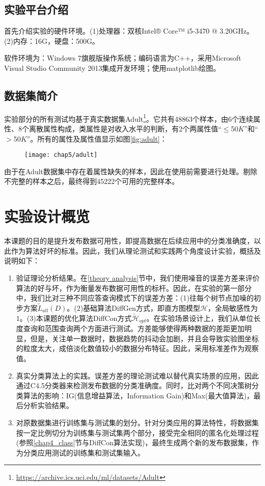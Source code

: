 \subsection{实验平台介绍}

首先介绍实验的硬件环境。(1)处理器：双核Intel® Core™ i5-3470 @ 3.20GHz。(2)内存：16G，硬盘：500G。

软件环境为：Windows 7旗舰版操作系统；编码语言为C++，采用Microsoft Visual Studio Community 2013集成开发环境；使用matplotlib绘图。

\subsection{数据集简介}

实验部分的所有测试均基于真实数据集Adult\footnote{\url{https://archive.ics.uci.edu/ml/datasets/Adult}}\supercite{adult}。它共有48863个样本，由6个连续属性、8个离散属性构成，类属性是对收入水平的判断，有2个两属性值“$\leqslant$50$K$”和“$>$50$K$”。所有的属性及属性值显示如图\ref{fig:adult}：

\begin{figure}[!htp]
	\centering
	\texttt{[image: chap5/adult]}
\end{figure}

由于在Adult数据集中存在着属性缺失的样本，因此在使用前需要进行处理。剔除不完整的样本之后，最终得到45222个可用的完整样本。

\section{实验设计概览}

本课题的目的是提升发布数据可用性，即提高数据在后续应用中的分类准确度，以此作为算法好坏的标准。因此，我们从理论测试和实践两个角度设计实验，概括及说明如下：
\begin{enumerate}
	\item 验证理论分析结果。在\ref{theory analysis}节中，我们使用噪音的误差方差来评价算法的好与坏，作为衡量发布数据可用性的标杆。因此，在实验的第一部分中，我们比对三种不同应答查询模式下的误差方差：(1)往每个树节点加噪的初步方案$\tilde{L}_{all}(D)$。(2)基础算法DiffGen方式，即直方图模型$\mathcal{H}$，全局敏感性为1。(3)本课题的优化算法DiffCon方式$\tilde{\mathcal{H}}_{opt}$。在实验场景设计上，我们从单位长度查询和范围查询两个方面进行测试。方差能够使得两种数据的差距更加明显，但是，关注单一数据时，数据趋势的抖动会加剧，并且会导致实验图坐标的粒度太大，成倍淡化数值较小的数据分布特征。因此，采用标准差作为观察值。
	\item 真实分类算法上的实践。误差方差的理论测试难以替代真实场景的应用，因此通过C4.5分类器\cite{C45}来检测发布数据的分类准确度。同时，比对两个不同决策树分类算法的影响：IG(信息增益算法，Information Gain)和Max\supercite{cart}(最大值算法)，最后分析实验结果。
	\item 对原数据集进行训练集与测试集的划分。针对分类应用的算法特性，将数据集按一定比例切分为训练集与测试集两个部分，接受完全相同的匿名化处理过程(参照\ref{chap4_class}节与DiffCon算法实现)，最终生成两个新的发布数据集，作为分类应用测试的训练集和测试集输入。
\end{enumerate}	

